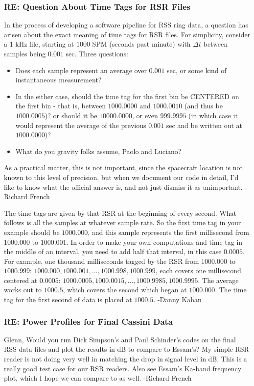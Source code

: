 \documentclass[crop=false,class=book]{standalone}
\begin{document}
\subsubsection{\footnotesize RE: Question About Time Tags for RSR Files}
In the process of developing a software pipeline for RSS ring data, a question has arisen about the exact meaning of time tags for RSR files. For simplicity, consider a 1 kHz file, starting at $1000$ SPM (seconds past minute) with $\Delta t$ between samples being $0.001$ sec. Three questions:
\begin{itemize}
    \item Does each sample     represent an average over $0.001$ sec, or some kind of instantaneous measurement?
    \item In the either case, should the time tag for the first bin be CENTERED  on the first bin - that is, between $1000.0000$ and $1000.0010$ (and thus be $1000.0005$)? or should it be $10000.0000$, or even $999.9995$ (in which case it would represent the average of the previous $0.001$ sec and be written out at $1000.0000$)?
    \item What do you gravity folks assume, Paolo and Luciano?
\end{itemize}
As a practical matter, this is not important, since the spacecraft location is not known to this level of precision, but when we document our code in detail, I'd like to know what the official answer is, and not just dismiss it as unimportant. -Richard French\par
The time tags are given by that RSR at the beginning of every second. What follows is all the samples at whatever sample rate. So the first time tag in your example should be $1000.000$, and this sample represents the first millisecond from $1000.000$ to $1000.001$. In order to make your own computations and time tag in the middle of an interval, you need to add half that interval, in this case $0.0005$. For example, one thousand milliseconds tagged by the RSR from $1000.000$ to $1000.999$: $1000.000,1000.001, \hdots, 1000.998,1000.999$, each covers one millisecond centered at $0.0005$: $1000.0005,1000.0015,\hdots,1000.9985,1000.9995$. The average works out to $1000.5$, which covers the second which began at $1000.000$. The time tag for the first second of data is placed at $1000.5$. -Danny Kahan
\subsubsection{RE: Power Profiles for Final Cassini Data}
Glenn, Would you run Dick Simpson's and Paul Schinder's codes on the final RSS data files and plot the results in dB to compare to Essam's? My simple RSR reader is not doing very well in matching the drop in signal level in dB. This is a really good test case for our RSR readers. Also see Essam's Ka-band frequency plot, which I hope we can compare to as well. -Richard French
\end{document}
